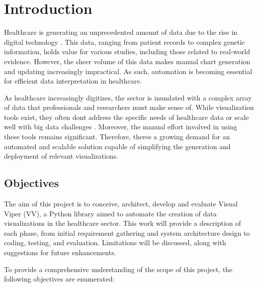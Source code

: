 \section{Introduction}\label{introduction}

Healthcare is generating an unprecedented amount of data due to the rise
in digital technology
\cite{1,2}. This data,
ranging from patient records to complex genetic information, holds value
for various studies, including those related to real-world evidence.
However, the sheer volume of this data makes manual chart generation and
updating increasingly impractical. As such, automation is becoming
essential for efficient data interpretation in healthcare.

As healthcare increasingly digitizes, the sector is inundated with a
complex array of data that professionals and researchers must make sense
of. While visualization tools exist, they often don\textquotesingle t
address the specific needs of healthcare data or scale well with big
data challenges
\cite{3,4}. Moreover,
the manual effort involved in using these tools remains significant.
Therefore, there\textquotesingle s a growing demand for an automated and
scalable solution capable of simplifying the generation and deployment
of relevant visualizations.

\subsection{Objectives}\label{objectives}

The aim of this project is to conceive, architect, develop and evaluate
Visual Viper (VV), a Python library aimed to automate the creation of
data visualizations in the healthcare sector. This work will provide a
description of each phase, from initial requirement gathering and system
architecture design to coding, testing, and evaluation. Limitations will
be discussed, along with suggestions for future enhancements.

To provide a comprehensive understanding of the scope of this project,
the following objectives are enumerated:

